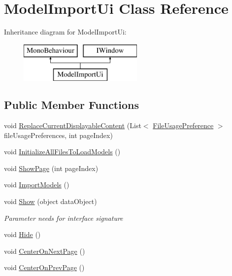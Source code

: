 \hypertarget{class_model_import_ui}{}\section{Model\+Import\+Ui Class Reference}
\label{class_model_import_ui}
Inheritance diagram for Model\+Import\+Ui\+:\begin{figure}[H]
\begin{center}
\leavevmode
\includegraphics[height=2.000000cm]{class_model_import_ui}
\end{center}
\end{figure}
\subsection*{Public Member Functions}
\begin{DoxyCompactItemize}
\item 
void \mbox{\hyperlink{class_model_import_ui_ad69f1875dc693625b159ae37b5d86671}{Replace\+Current\+Displayable\+Content}} (List$<$ \mbox{\hyperlink{class_file_usage_preference}{File\+Usage\+Preference}} $>$ file\+Usage\+Preferences, int page\+Index)
\item 
void \mbox{\hyperlink{class_model_import_ui_a193c32700872638392857e078af43ad2}{Initialize\+All\+Files\+To\+Load\+Models}} ()
\item 
void \mbox{\hyperlink{class_model_import_ui_ab3f81f6357a8a955ab08082ee631b62f}{Show\+Page}} (int page\+Index)
\item 
void \mbox{\hyperlink{class_model_import_ui_a3f6af56cdb9c346acfc58d9c00c4e6b0}{Import\+Models}} ()
\item 
void \mbox{\hyperlink{class_model_import_ui_a8f2d7bf13a1f5ad893e24106a56df774}{Show}} (object data\+Object)
\begin{DoxyCompactList}\small\item\em Parameter needs for interface signature \end{DoxyCompactList}\item 
void \mbox{\hyperlink{class_model_import_ui_ad4cdb69e11afb1cc7cd6ec723bfde8a0}{Hide}} ()
\item 
void \mbox{\hyperlink{class_model_import_ui_aae15ee15a6833496236511ddf9caf8e3}{Center\+On\+Next\+Page}} ()
\item 
void \mbox{\hyperlink{class_model_import_ui_aca3d68848d4f475e18e38b00913d1b7a}{Center\+On\+Prev\+Page}} ()
\end{DoxyCompactItemize}
